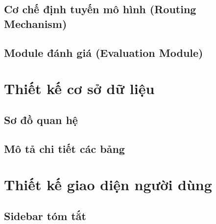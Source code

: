 \subsection{Cơ chế định tuyến mô hình (Routing Mechanism)}

\subsection{Module đánh giá (Evaluation Module)}

\section{Thiết kế cơ sở dữ liệu}

\subsection{Sơ đồ quan hệ}

\subsection{Mô tả chi tiết các bảng}

\section{Thiết kế giao diện người dùng}

\subsection{Sidebar tóm tắt}

